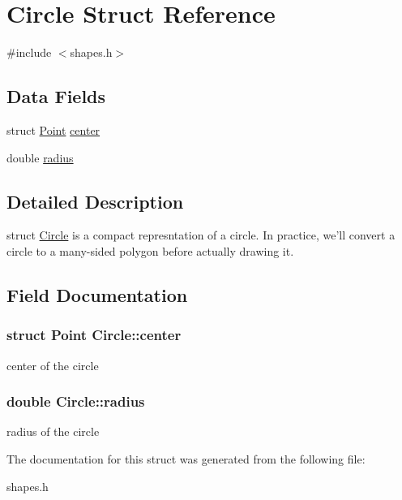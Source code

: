 \hypertarget{structCircle}{
\section{Circle Struct Reference}
\label{structCircle}
}


{\ttfamily \#include $<$shapes.h$>$}\subsection*{Data Fields}
\begin{DoxyCompactItemize}
\item 
struct \hyperlink{structPoint}{Point} \hyperlink{structCircle_adfa336ae0229e8f13928b9a95cbaf617}{center}
\item 
double \hyperlink{structCircle_a5a0212ba705f57d762bd6b202e3d10ed}{radius}
\end{DoxyCompactItemize}


\subsection{Detailed Description}
struct \hyperlink{structCircle}{Circle} is a compact represntation of a circle. In practice, we'll convert a circle to a many-\/sided polygon before actually drawing it. 

\subsection{Field Documentation}
\hypertarget{structCircle_adfa336ae0229e8f13928b9a95cbaf617}{
\subsubsection[{center}]{\setlength{\rightskip}{0pt plus 5cm}struct {\bf Point} {\bf Circle::center}}}
\label{structCircle_adfa336ae0229e8f13928b9a95cbaf617}
center of the circle \hypertarget{structCircle_a5a0212ba705f57d762bd6b202e3d10ed}{
\subsubsection[{radius}]{\setlength{\rightskip}{0pt plus 5cm}double {\bf Circle::radius}}}
\label{structCircle_a5a0212ba705f57d762bd6b202e3d10ed}
radius of the circle 

The documentation for this struct was generated from the following file:\begin{DoxyCompactItemize}
\item 
shapes.h\end{DoxyCompactItemize}
